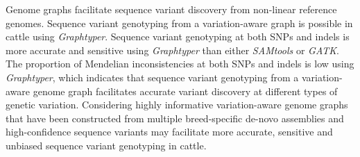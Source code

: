 \documentclass[../main.tex]{subfiles}
\begin{document}
Genome graphs facilitate sequence variant discovery from non-linear reference genomes. Sequence variant genotyping from a variation-aware graph is possible in cattle using \emph{Graphtyper}. Sequence variant genotyping at both SNPs and indels is more accurate and sensitive using \emph{Graphtyper} than either \emph{SAMtools} or \emph{GATK}. The proportion of Mendelian inconsistencies at both SNPs and indels is low using \emph{Graphtyper}, which indicates that sequence variant genotyping from a variation-aware genome graph facilitates accurate variant discovery at different types of genetic variation. Considering highly informative variation-aware genome graphs that have been constructed from multiple breed-specific de-novo assemblies and high-confidence sequence variants may facilitate more accurate, sensitive and unbiased sequence variant genotyping in cattle.

%


\singlespacing
\footnotesize

% 



\ifdefined\BuildingFromMainFile
\else
   
\end{document}
